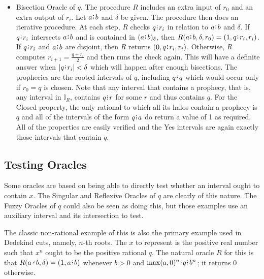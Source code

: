 \documentclass[12pt]{article}
\begin{document}
\begin{itemize}
    \item Bisection Oracle of $q$. The procedure $R$ includes an extra input of $r_0$ and an extra output of $r_i$. Let $a \rint b$ and $\delta$ be given. The procedure then does an iterative procedure.  At each step, $R$ checks $q \rint r_i$ in relation to $a \rint b$ and $\delta$. If $q \rint r_i$ intersects $a \rint b$ and is contained in $\halo{a \rint b}$, then $R(a \rint b, \delta, r_0) = (1, q \rint r_i, r_i)$. If $q \rint r_i$ and $a \rint b$ are disjoint, then $R$ returns $(0, q \rint r_i, r_i)$. Otherwise, $R$ computes $r_{i+1} = \frac{q + r_i}{2}$ and then runs the check again. This will have a definite answer when $|q \rint r_i| < \delta$ which will happen after enough bisections. The prophecies are the rooted intervals of $q$, including $q \rint q$ which would occur only if $r_0 = q$ is chosen. Note that any interval that contains a prophecy, that is, any interval in $\mathbb{I}_R$, contains $q \rint r$ for some $r$ and thus contains $q$. For the Closed property, the only rational to which all its halos contain a prophecy is $q$ and all of the intervals of the form $q \rint a$ do return a value of 1 as required. All of the properties are easily verified and the Yes intervals are again exactly those intervals that contain $q$.
\end{itemize}

\subsection{Testing Oracles}

Some oracles are based on being able to directly test whether an interval ought to contain $x$. The Singular and Reflexive Oracles of $q$ are clearly of this nature. The Fuzzy Oracles of $q$ could also be seen as doing this, but those examples use an auxiliary interval and its intersection to test. 

The classic non-rational example of this is also the primary example used in Dedekind cuts, namely, $n$-th roots. The $x$ to represent is the positive real number such that $x^n$ ought to be the positive rational $q$. The natural oracle $R$ for this is that $R(a\lte b, \delta) = (1, a\rint b)$ whenever $b > 0$ and $\max(a, 0)^n\rint q\rint b^n$; it returns $0$ otherwise. 
\end{document}

